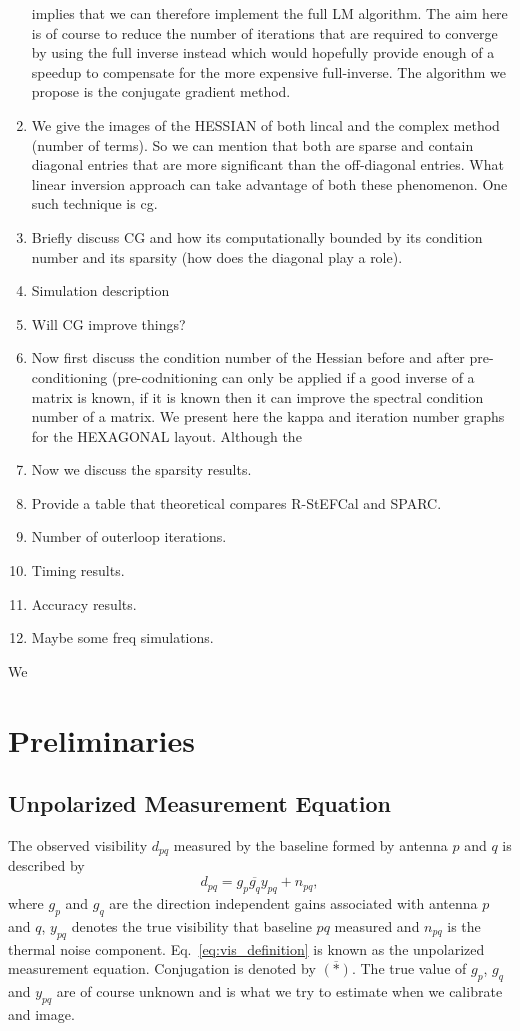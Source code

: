 \documentclass[useAMS,usenatbib]{mn2e}
\newcommand{\conj}[1]{\overline{#1}}
\begin{document}
\begin{enumerate}
 implies that we can therefore implement the full LM algorithm. The aim here is of course to reduce the number of iterations that are required to converge by using the 
 full inverse instead which would hopefully provide enough of a speedup to compensate for the more expensive full-inverse. The algorithm we propose is the conjugate 
 gradient method.
 \item We give the images of the HESSIAN of both lincal and the complex method (number of terms). So we can mention that both are sparse and contain diagonal entries that 
 are more significant than the off-diagonal entries. What linear inversion approach can take advantage of both these phenomenon. One such technique is 
 cg. 
 \item Briefly discuss CG and how its computationally bounded by its condition number and its sparsity (how does the diagonal play a role).
 \item Simulation description
 \item Will CG improve things?
 \item Now first discuss the condition
 number of the Hessian before and after pre-conditioning (pre-codnitioning can only be applied if a good inverse of a matrix is known, if it is known then it can improve 
 the spectral condition number of a matrix. We present here the kappa and iteration number graphs for the HEXAGONAL layout. Although the
 \item Now we discuss the sparsity results. 
 \item Provide a table that theoretical compares R-StEFCal and SPARC.
 \item Number of outerloop iterations. 
 \item Timing results.
 \item Accuracy results.
 \item Maybe some freq simulations.
 \end{enumerate}
 
 We
 
\section{Preliminaries}

\subsection{Unpolarized Measurement Equation}
The observed visibility $d_{pq}$ measured by the baseline formed by antenna $p$ and $q$ is described by
\begin{equation}
\label{eq:vis_definition}
d_{pq} = g_{p}\conj{g_q}y_{pq} + n_{pq},
\end{equation}
where $g_{p}$ and $g_{q}$ are the direction independent gains associated with antenna $p$ and $q$, $y_{pq}$ denotes the true visibility that baseline $pq$ measured
and $n_{pq}$ is the thermal noise component. Eq.~\eqref{eq:vis_definition} is known as the unpolarized measurement equation. Conjugation is denoted by $\conj{(*)}$. The true value of $g_p$, $g_q$ and $y_{pq}$ are of course unknown and is what we try to estimate when we calibrate 
and image.
\end{document}
